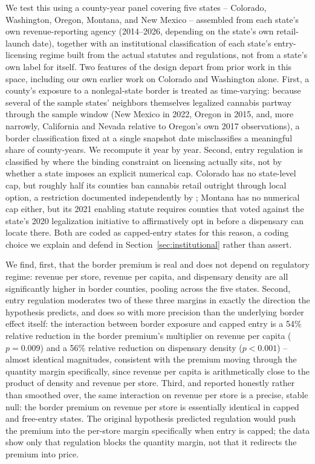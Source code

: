 \documentclass[12pt]{article}
\begin{document}
We test this using a county-year panel covering five states -- Colorado, Washington, Oregon, Montana, and New
Mexico -- assembled from each state's own revenue-reporting agency (2014--2026, depending on the state's own
retail-launch date), together with an institutional classification of each state's entry-licensing regime built
from the actual statutes and regulations, not from a state's own label for itself. Two features of the design
depart from prior work in this space, including our own earlier work on Colorado and Washington alone. First,
a county's exposure to a nonlegal-state border is treated as time-varying: because several of the sample
states' neighbors themselves legalized cannabis partway through the sample window (New Mexico in 2022, Oregon
in 2015, and, more narrowly, California and Nevada relative to Oregon's own 2017 observations), a border
classification fixed at a single snapshot date misclassifies a meaningful share of county-years. We recompute
it year by year. Second, entry regulation is classified by where the binding constraint on licensing actually
sits, not by whether a state imposes an explicit numerical cap. Colorado has no state-level cap, but roughly
half its counties ban cannabis retail outright through local option, a restriction documented independently by
\citet{PayanBrownSong2021}; Montana has no numerical cap either, but its 2021 enabling statute requires
counties that voted against the state's 2020 legalization initiative to affirmatively opt in before a
dispensary can locate there. Both are coded as capped-entry states for this reason, a coding choice we explain
and defend in Section~\ref{sec:institutional} rather than assert.

We find, first, that the border premium is real and does not depend on regulatory regime: revenue per store,
revenue per capita, and dispensary density are all significantly higher in border counties, pooling across the
five states. Second, entry regulation moderates two of these three margins in exactly the direction the
hypothesis predicts, and does so with more precision than the underlying border effect itself: the interaction
between border exposure and capped entry is a 54\% relative reduction in the border premium's multiplier on
revenue per capita ($p=0.009$) and a 56\% relative reduction on dispensary density ($p<0.001$) -- almost
identical magnitudes, consistent with the
premium moving through the quantity margin specifically, since revenue per capita is arithmetically close to
the product of density and revenue per store. Third, and reported honestly rather than smoothed over, the same
interaction on revenue per store is a precise, stable null: the border premium on revenue per store is
essentially identical in capped and free-entry states. The original hypothesis predicted regulation would push
the premium into the per-store margin specifically when entry is capped; the data show only that regulation
blocks the quantity margin, not that it redirects the premium into price.
\end{document}
